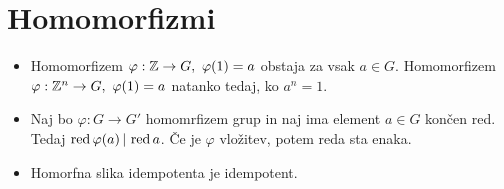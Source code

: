 \section{Homomorfizmi}
\begin{itemize}
    \item Homomorfizem \(\varphi: \Z \to G, \ \varphi(1) = a\) obstaja za vsak \(a \in G\). Homomorfizem \(\varphi: \Z^n \to G, \ \varphi(1) = a\) natanko tedaj, ko \(a^n = 1\).
    \item Naj bo \(\varphi: G \to G'\) homomrfizem grup in naj ima element \(a \in G\) končen red. Tedaj \(\operatorname{red} \varphi(a) \, | \, \operatorname{red} a\). Če je \(\varphi\) vložitev, potem reda sta enaka.
    \item Homorfna slika idempotenta je idempotent.
\end{itemize}